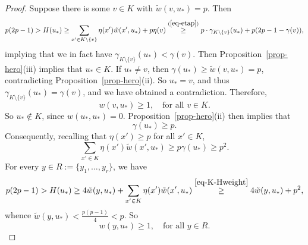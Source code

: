 \documentclass[10pt,a4paper]{amsart}
\begin{document}
\begin{proof}
	Suppose there is some $v \in K$ with $\tilde{w}(v,u_*) = p$.
	Then
	$$
	p(2p-1)>H(u_*)\ge \sum_{x' \in K\setminus\{v\}}\eta(x')\tilde{w}(x',u_*) + p\eta(v) \stackrel{(\ref{eq-etap})}{\ge} p\cdot\gamma_{K\setminus \{v\}}(u_*) + p(2p-1-\gamma(v)),
	$$
	implying that we in fact have $\gamma_{K\setminus\{v\}}(u_*) <  \gamma(v)$. Then Proposition~\ref{prop-hero}(iii) implies that $u_* \in K$.
	If $u_* \neq v$, then $\gamma(u_*) \geq \tilde{w}(v,u_*) = p$, contradicting Proposition~\ref{prop-hero}(ii).
	So $u_*=v$, and thus $\gamma_{K\setminus\{v\}}(u_*) = \gamma(v)$, and we have obtained a contradiction.
	Therefore,
	\begin{equation}\label{eq-K-linked}
		w(v,u_*) \geq 1,\quad\text{for all }v \in K.
	\end{equation}
	So $u_* \notin K$, since $w(u_*,u_*)=0$. Proposition~\ref{prop-hero}(ii) then implies that \begin{equation}\label{gammau*}
		\gamma(u_*) \geq p.
	\end{equation}
	Consequently, recalling that $\eta(x') \geq p$ for all $x' \in K$,
	\begin{equation}\label{eq-K-Hweight}
		\sum_{x' \in K}\eta(x')\tilde{w}(x',u_*) \geq p\gamma(u_*)\ge p^2.
	\end{equation}
	For every $y \in R := \lbrace y_1,\ldots,y_r\rbrace$, we have
	$$
	p(2p-1)>H(u_*)\ge 4\tilde{w}(y,u_*)+\sum_{x' \in K}\eta(x')\tilde{w}(x',u_*)\stackrel{\eqref{eq-K-Hweight}}{\ge} 4\tilde{w}(y,u_*)+p^2,
	$$
	whence $\tilde{w}(y,u_*)<\frac{p(p-1)}{4}<p$. So \begin{equation}\label{eq-R-linked}
		w(y,u_*) \geq 1,\quad\text{for all }y \in R.
	\end{equation}
	

\end{proof}
\end{document}
